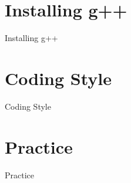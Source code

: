 \documentclass[t]{beamer}
\begin{document}
\section{Installing g++}
\begin{frame}{Installing g++}
\end{frame}

\section{Coding Style}
\begin{frame}{Coding Style}
\end{frame}

\section{Practice}
\begin{frame}{Practice}
\end{frame}
\end{document}
